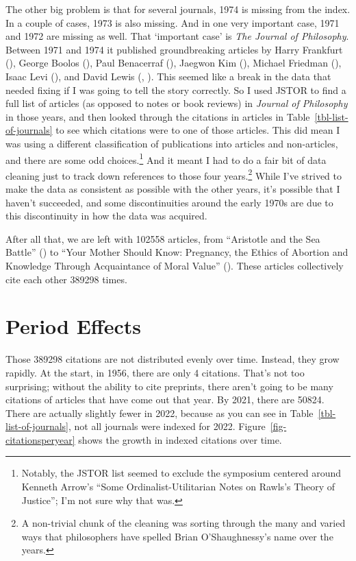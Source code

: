 \documentclass[
  11pt,
  letterpaper,
  DIV=11,
  numbers=noendperiod,
  twoside]{scrartcl}
\begin{document}
The other big problem is that for several journals, 1974 is missing from
the index. In a couple of cases, 1973 is also missing. And in one very
important case, 1971 and 1972 are missing as well. That `important case'
is \emph{The Journal of Philosophy}. Between 1971 and 1974 it published
groundbreaking articles by Harry Frankfurt
(), George Boolos
(), Paul Benacerraf
(), Jaegwon Kim
(), Michael Friedman
(), Isaac Levi
(), and David Lewis
(, ).
This seemed like a break in the data that needed fixing if I was going
to tell the story correctly. So I used JSTOR to find a full list of
articles (as opposed to notes or book reviews) in \emph{Journal of
Philosophy} in those years, and then looked through the citations in
articles in Table~\ref{tbl-list-of-journals} to see which citations were
to one of those articles. This did mean I was using a different
classification of publications into articles and non-articles, and there
are some odd choices.\footnote{Notably, the JSTOR list seemed to exclude
  the symposium centered around Kenneth Arrow's ``Some
  Ordinalist-Utilitarian Notes on Rawls's Theory of Justice''; I'm not
  sure why that was.} And it meant I had to do a fair bit of data
cleaning just to track down references to those four years.\footnote{A
  non-trivial chunk of the cleaning was sorting through the many and
  varied ways that philosophers have spelled Brian O'Shaughnessy's name
  over the years.} While I've strived to make the data as consistent as
possible with the other years, it's possible that I haven't succeeded,
and some discontinuities around the early 1970s are due to this
discontinuity in how the data was acquired.

After all that, we are left with 102558 articles, from ``Aristotle and
the Sea Battle'' () to ``Your
Mother Should Know: Pregnancy, the Ethics of Abortion and Knowledge
Through Acquaintance of Moral Value''
(). These articles collectively
cite each other 389298 times.

\section{Period Effects}\label{sec-period}

Those 389298 citations are not distributed evenly over time. Instead,
they grow rapidly. At the start, in 1956, there are only 4 citations.
That's not too surprising; without the ability to cite preprints, there
aren't going to be many citations of articles that have come out that
year. By 2021, there are 50824. There are actually slightly fewer in
2022, because as you can see in Table~\ref{tbl-list-of-journals}, not
all journals were indexed for 2022. Figure~\ref{fig-citationsperyear}
shows the growth in indexed citations over time.
\end{document}
